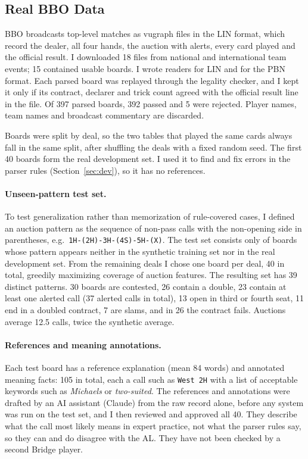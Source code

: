 \documentclass[11pt]{article}
\begin{document}
\subsection{Real BBO Data}

BBO broadcasts top-level matches as vugraph files in the LIN format, which record the dealer, all four hands, the auction with alerts, every card played and the official result. I downloaded 18 files from national and international team events; 15 contained usable boards. I wrote readers for LIN and for the PBN format. Each parsed board was replayed through the legality checker, and I kept it only if its contract, declarer and trick count agreed with the official result line in the file. Of 397 parsed boards, 392 passed and 5 were rejected. Player names, team names and broadcast commentary are discarded.

Boards were split by deal, so the two tables that played the same cards always fall in the same split, after shuffling the deals with a fixed random seed. The first 40 boards form the real development set. I used it to find and fix errors in the parser rules (Section~\ref{sec:dev}), so it has no references.

\paragraph{Unseen-pattern test set.} To test generalization rather than memorization of rule-covered cases, I defined an auction pattern as the sequence of non-pass calls with the non-opening side in parentheses, e.g.\ \texttt{1H-(2H)-3H-(4S)-5H-(X)}. The test set consists only of boards whose pattern appears neither in the synthetic training set nor in the real development set. From the remaining deals I chose one board per deal, 40 in total, greedily maximizing coverage of auction features. The resulting set has 39 distinct patterns. 30 boards are contested, 26 contain a double, 23 contain at least one alerted call (37 alerted calls in total), 13 open in third or fourth seat, 11 end in a doubled contract, 7 are slams, and in 26 the contract fails. Auctions average 12.5 calls, twice the synthetic average.

\paragraph{References and meaning annotations.} Each test board has a reference explanation (mean 84 words) and annotated meaning facts: 105 in total, each a call such as \texttt{West 2H} with a list of acceptable keywords such as \emph{Michaels} or \emph{two-suited}. The references and annotations were drafted by an AI assistant (Claude) from the raw record alone, before any system was run on the test set, and I then reviewed and approved all 40. They describe what the call most likely means in expert practice, not what the parser rules say, so they can and do disagree with the AL. They have not been checked by a second Bridge player.
\end{document}
